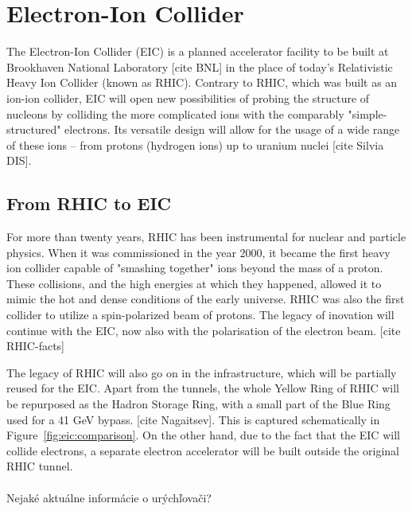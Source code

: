 \chapter{Electron-Ion Collider}\label{cha:EIC} %

The Electron-Ion Collider (EIC) is a planned accelerator facility to be built at Brookhaven National Laboratory [cite BNL] in the place of today's Relativistic Heavy Ion Collider (known as RHIC). Contrary to RHIC, which was built as an ion-ion collider, EIC will open new possibilities of probing the structure of nucleons by colliding the more complicated ions  with the comparably "simple-structured" electrons. Its versatile design will allow for the usage of a wide range of these ions – from protons (hydrogen ions) up to uranium nuclei [cite Silvia DIS].

\section{From RHIC to EIC}
For more than twenty years, RHIC has been instrumental for nuclear and particle physics. When it was commissioned in the year 2000, it became the first heavy ion collider capable of "smashing together" ions beyond the mass of a proton. These collisions, and the high energies at which they happened, allowed it to mimic the hot and dense conditions of the early universe. RHIC was also the first collider to utilize a spin-polarized beam of protons. The legacy of inovation will continue with the EIC, now also with the polarisation of the electron beam. [cite RHIC-facts]

The legacy of RHIC will also go on in the infrastructure, which will be partially reused for the EIC. Apart from the tunnels, the whole Yellow Ring of RHIC will be repurposed as the Hadron Storage Ring, with a small part of the Blue Ring used for a 41 GeV bypass. [cite Nagaitsev]. This is captured schematically in Figure~\ref{fig:eic:comparison}. On the other hand, due to the fact that the EIC will collide electrons, a separate electron accelerator will be built outside the original RHIC tunnel.
\\\,\\
Nejaké aktuálne informácie o urýchľovači?

